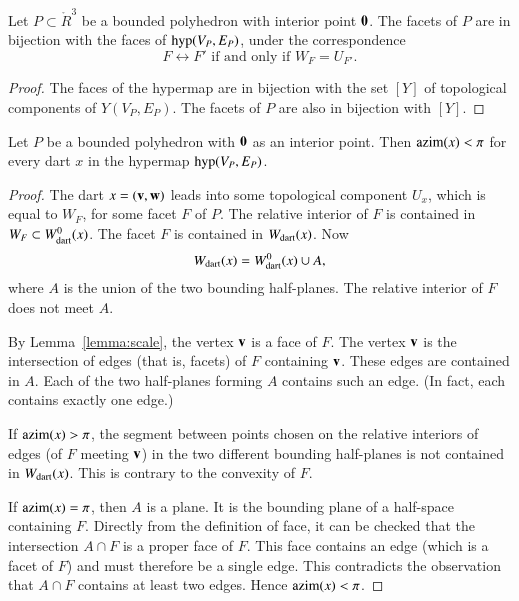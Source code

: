 \begin{lemma}\label{lemma:facet-bi}
Let $P\subset\ring{R}^3$ be a bounded polyhedron with interior point
${\mathbf 0}$.  The facets of $P$ are in bijection with the faces of
${\operatorname{hyp}}(V_P,E_P)$, under the correspondence
\begin{displaymath}
F\leftrightarrow F' \text{ if and only if } W_F = U_{F'}.
\end{displaymath}
\end{lemma}

\begin{proof} The faces of the hypermap are in bijection with the set
$[Y]$ of topological components of $Y(V_P,E_P)$.  The facets of $P$
are also in bijection with $[Y]$.
\end{proof}

\begin{lemma} Let $P$ be a bounded polyhedron
with ${\mathbf 0}$ as an interior point.  Then ${\operatorname{azim}}(x) < \pi$ for
every dart $x$ in the hypermap ${\operatorname{hyp}}(V_P,E_P)$.
\end{lemma}
%
%
%
%

\begin{proof} The dart $x=({\mathbf v},{\mathbf w})$ leads into some topological
component $U_x$, which is equal to $W_F$, for some facet $F$ of $P$.
The relative interior of $F$ is contained in $W_F\subset W^0_{\text{dart}}(x)$.
The facet $F$ is contained in $W_{\text{dart}}(x)$. Now
\begin{displaymath}
W_{\text{dart}}(x) = W^0_{\text{dart}}(x)\cup A,
\end{displaymath}
where $A$ is the union of the two bounding half-planes.  The relative
interior of $F$ does not meet $A$.

By Lemma~\ref{lemma:scale}, the vertex ${\mathbf v}$ is a face of $F$.  The
vertex ${\mathbf v}$ is the intersection of edges (that is, facets) of $F$
containing ${\mathbf v}$.  These edges are contained in $A$.  Each of the two
half-planes forming $A$ contains such an edge. (In fact, each contains
exactly one edge.)  %
%
%
%
%

If ${\operatorname{azim}}(x)>\pi$, the segment between points chosen on the
relative interiors of edges (of $F$ meeting ${\mathbf v}$) in the two different
bounding half-planes is not contained in $W_{\text{dart}}(x)$.  This is
contrary to the convexity of $F$.  %
%

If ${\operatorname{azim}}(x)=\pi$, then $A$ is a plane.  It is the bounding plane
of a half-space containing $F$.  Directly from the definition of face,
it can be checked that the intersection $A\cap F$ is a proper face of
$F$.  This face contains an edge (which is a facet of $F$) and must
therefore be a single edge.  This contradicts the observation that
$A\cap F$ contains at least two edges.  Hence ${\operatorname{azim}}(x)<\pi$.
\end{proof}


